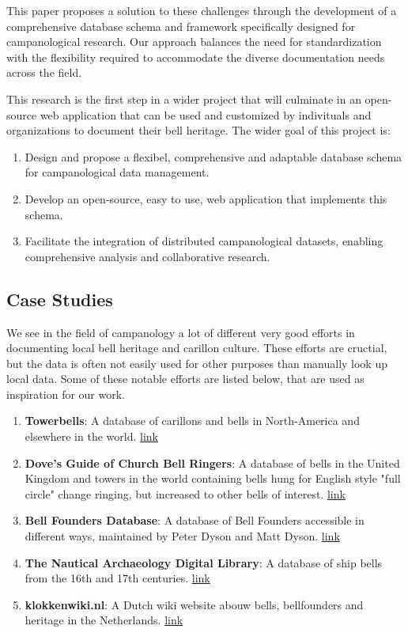 \documentclass[11pt, a4paper]{article}
\begin{document}
This paper proposes a solution to these challenges through the development of a comprehensive database schema and framework specifically designed for campanological research. Our approach balances the need for standardization with the flexibility required to accommodate the diverse documentation needs across the field.

This research is the first step in a wider project that will culminate in an open-source web application that can be used and customized by indivituals and organizations to document their bell heritage. The wider goal of this project is:

\begin{enumerate}
    \item Design and propose a flexibel, comprehensive and adaptable database schema for campanological data management.
    \item Develop an open-source, easy to use, web application that implements this schema.
    \item Facilitate the integration of distributed campanological datasets, enabling comprehensive analysis and collaborative research.
\end{enumerate}

\subsection{Case Studies}

We see in the field of campanology a lot of different very good efforts in documenting local bell heritage and carillon culture. These efforts are cructial, but the data is often not easily used for other purposes than manually look up local data. Some of these notable efforts are listed below, that are used as inspiration for our work.

\begin{enumerate}
    \item \textbf{Towerbells}: A database of carillons and bells in North-America and elsewhere in the world. \href{https://www.towerbells.org/}{link}
    \item \textbf{Dove's Guide of Church Bell Ringers}: A database of bells in the United Kingdom and towers in the world containing bells hung for English style "full circle" change ringing, but increased to other bells of interest. \href{https://dove.cccbr.org.uk/}{link}
    \item \textbf{Bell Founders Database}: A database of Bell Founders accessible in different ways, maintained by Peter Dyson and Matt Dyson. \href{https://www.bellfounders.net}{link}
    \item \textbf{The Nautical Archaeology Digital Library}: A database of ship bells from the 16th and 17th centuries. \href{https://shiplib.org/index.php/collections/artifact-collections/early-ship-bells-database/}{link} 
    \item \textbf{klokkenwiki.nl}: A Dutch wiki website abouw bells, bellfounders and heritage in the Netherlands. \href{https://www.klokkenwiki.nl}{link}
\end{enumerate}
\end{document}
